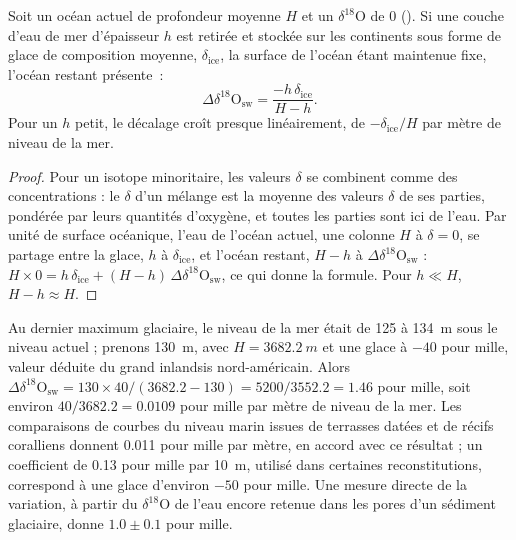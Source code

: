 \begin{proposition}\label{prop:b2:climate-proxies:mass-balance}
Soit un océan actuel de profondeur moyenne $H$ et un $\delta^{18}$O de 0 (). Si une couche d'eau de mer d'épaisseur $h$
est retirée et stockée sur les continents sous forme de glace de composition moyenne,
$\delta_{\mathrm{ice}}$, la surface de l'océan étant maintenue fixe, l'océan restant présente~:
\[
  \Delta\delta^{18}\mathrm{O}_{\mathrm{sw}} = \frac{-h\,\delta_{\mathrm{ice}}}{H - h}.
\]
Pour un $h$ petit, le décalage croît presque linéairement, de $-\delta_{\mathrm{ice}}/H$ par mètre de niveau de la mer.
\end{proposition}

\begin{proof}
Pour un isotope minoritaire, les valeurs $\delta$ se combinent comme des concentrations : le $\delta$ d'un mélange est
la moyenne des valeurs $\delta$ de ses parties, pondérée par leurs quantités d'oxygène, et toutes les parties
sont ici de l'eau. Par unité de surface océanique, l'eau de l'océan actuel, une colonne $H$ à
$\delta = 0$, se partage entre la glace, $h$ à $\delta_{\mathrm{ice}}$, et l'océan restant,
$H - h$ à $\Delta\delta^{18}\mathrm{O}_{\mathrm{sw}}$ :
$H \times 0 = h\,\delta_{\mathrm{ice}} + (H - h)\,\Delta\delta^{18}\mathrm{O}_{\mathrm{sw}}$, ce qui
donne la formule. Pour $h \ll H$, $H - h \approx H$.
\end{proof}

\begin{example}\label{ex:b2:climate-proxies:lgm}
Au dernier maximum glaciaire, le niveau de la mer était de 125 à \qty{134}{m} sous le niveau actuel ; prenons \qty{130}{m},
avec $H = \qty{3682.2}{m}$ et une glace à $-40$ pour mille, valeur déduite du grand inlandsis
nord-américain. Alors
$\Delta\delta^{18}\mathrm{O}_{\mathrm{sw}} = 130 \times 40/(3682.2 - 130) = 5200/3552.2 = 1.46$
pour mille, soit environ $40/3682.2 = 0.0109$ pour mille par mètre de niveau de la mer. Les comparaisons de
courbes du niveau marin issues de terrasses datées et de récifs coralliens donnent \num{0.011} pour mille par
mètre, en accord avec ce résultat ; un coefficient de \num{0.13} pour mille par \qty{10}{m}, utilisé dans certaines
reconstitutions, correspond à une glace d'environ $-50$ pour mille. Une mesure directe de la variation, à partir du
$\delta^{18}$O de l'eau encore retenue dans les pores d'un sédiment glaciaire, donne $1.0 \pm 0.1$ pour mille.
\end{example}

